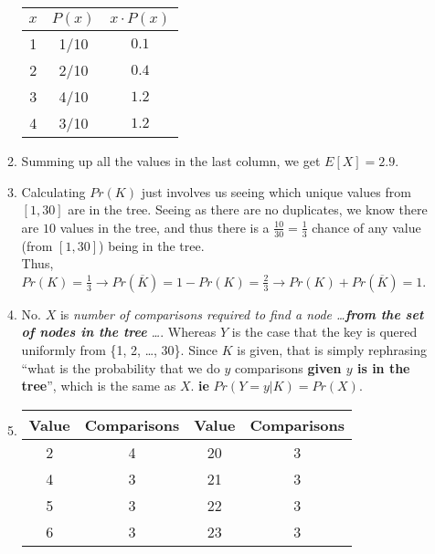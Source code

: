 \documentclass{article}
\begin{document}
\begin{enumerate}
\begin{enumerate}[label=\arabic*.]
                    \begin{tabular}{c|c|c}
                        $x$ & $P(x)$ & $x \cdot P(x)$ \\
                        \hline
                        1   & 1/10   & $0.1$          \\
                        2   & 2/10   & $0.4$          \\
                        3   & 4/10   & $1.2$          \\
                        4   & 3/10   & $1.2$
                    \end{tabular}
              \item Summing up all the values in the last column, we get $E[X] = 2.9$.
              \item Calculating $Pr(K)$ just involves us seeing which unique values from $[1, 30]$ are in the tree.
                    Seeing as there are no duplicates, we know there are \(10\) values in the tree, and thus
                    there is a \(\frac{10}{30} = \frac{1}{3}\) chance of any value (from \([1, 30]\)) being in the tree. \\
                    Thus, \(Pr(K) = \frac{1}{3} \rightarrow Pr(\overline{K}) = 1 - Pr(K) = \frac{2}{3} \rightarrow Pr(K) + Pr(\overline{K}) = 1\).
              \item No. $X$ is \textit{number of comparisons required to find a node \dots \textbf{from the set of nodes in the tree} \dots}.
                    Whereas $Y$ is the case that the key is quered uniformly from \{1, 2, \dots, 30\}. Since $K$ is given, that is simply rephrasing
                    ``what is the probability that we do $y$ comparisons \textbf{given $y$ is in the tree}'', which is the same as $X$. \textbf{ie} \(Pr(Y = y | K) = Pr(X)\).
              \item \begin{multicols}{2}
                        \begin{tabular}{c|c||c|c}
                            Value & Comparisons & Value & Comparisons \\
                            \hline
                            2     & 4           & 20    & 3           \\
                            4     & 3           & 21    & 3           \\
                            5     & 3           & 22    & 3           \\
                            6     & 3           & 23    & 3           \\

\end{tabular}
\end{multicols}
\end{enumerate}
\end{enumerate}
\end{document}

